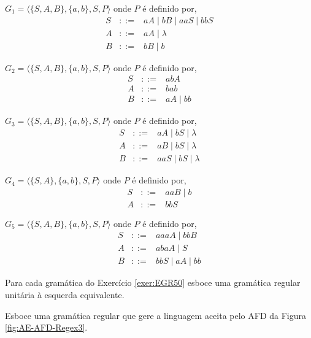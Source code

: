 \begin{exerList}
	\item $G_1 = \langle \{S, A, B\},\{a, b\}, S, P \rangle$ onde $P$ é definido por, 
	\begin{eqnarray*}
		S & ::= & aA \mid bB \mid aaS \mid bbS\\
		A & ::= & aA \mid \lambda \\
		B & ::= & bB \mid b
	\end{eqnarray*}
	
	\item $G_2 = \langle \{S, A, B\},\{a, b\}, S, P \rangle$ onde $P$ é definido por, 
	\begin{eqnarray*}
		S & ::= & abA\\
		A & ::= & bab\\
		B & ::= & aA \mid bb
	\end{eqnarray*}

	\item $G_3 = \langle \{S, A, B\},\{a, b\}, S, P \rangle$ onde $P$ é definido por, 
	\begin{eqnarray*}
		S & ::= & aA \mid bS \mid \lambda\\
		A & ::= & aB \mid bS \mid \lambda \\
		B & ::= & aaS \mid bS \mid \lambda 
	\end{eqnarray*}

	\item $G_4 = \langle \{S, A\},\{a, b\}, S, P \rangle$ onde $P$ é definido por,
	\begin{eqnarray*}
		S & ::= & aaB \mid b\\
		A & ::= & bbS 
	\end{eqnarray*}
	
	\item $G_5 = \langle \{S, A, B\},\{a, b\}, S, P \rangle$ onde $P$ é definido por, 
	\begin{eqnarray*}
		S & ::= & aaaA \mid bbB\\
		A & ::= & abaA \mid S\\
		B & ::= & bbS \mid aA \mid bb
	\end{eqnarray*}
\end{exerList}

\begin{questao}\label{exer:EGR51}
	Para cada gramática do Exercício \ref{exer:EGR50} esboce uma gramática regular unitária à esquerda equivalente. 
\end{questao}

\begin{questao}\label{exer:EGR52}
	Esboce uma gramática regular que gere a linguagem aceita pelo AFD da Figura \ref{fig:AE-AFD-Regex3}. 
\end{questao}